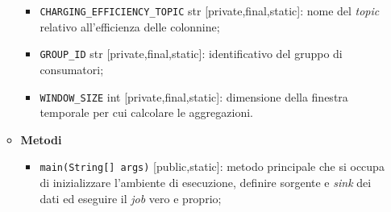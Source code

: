 \begin{itemize}
\begin{itemize}
\begin{itemize}
			            \item \texttt{CHARGING\_EFFICIENCY\_TOPIC} str [private,final,static]: nome del \textit{topic} relativo all'efficienza delle colonnine;
			            \item \texttt{GROUP\_ID} str [private,final,static]: identificativo del gruppo di consumatori;
			            \item \texttt{WINDOW\_SIZE} int [private,final,static]: dimensione della finestra temporale per cui calcolare le aggregazioni.
		            \end{itemize}
		      \item \textbf{Metodi}
		            \begin{itemize}
			            \item \texttt{main(String[] args)} [public,static]: metodo principale che si occupa di inizializzare l'ambiente di esecuzione, definire sorgente e \textit{sink} dei dati ed eseguire il \textit{job} vero e proprio;


\end{itemize}
\end{itemize}
\end{itemize}

